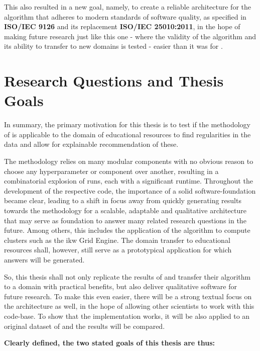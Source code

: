 This also resulted in a new goal, namely, to create a reliable architecture for the algorithm that adheres to modern standards of software quality, as specified in \textbf{ISO/IEC 9126} and its replacement \textbf{ISO/IEC 25010:2011}, in the hope of making future research just like this one - where the validity of the algorithm and its ability to transfer to new domains is tested - easier than it was for \me.



\section{Research Questions and Thesis Goals}
\label{sec:goals_research_questions}

In summary, the primary motivation for this thesis is to test if the methodology of \textcite{Derrac2015} is applicable to the domain of educational resources to find regularities in the data and allow for explainable recommendation of these. 

The methodology relies on many modular components with no obvious reason to choose any hyperparameter or component over another, resulting in a combinatorial explosion of runs, each with a significant runtime. Throughout the development of the respective code, the importance of a solid software-foundation became clear, leading to a shift in focus away from quickly generating results towards the methodology for a scalable, adaptable and qualitative architecture that may serve as foundation to answer many related research questions in the future. Among others, this includes the application of the algorithm to compute clusters such as the \gls{ikw} Grid Engine. The domain transfer to educational resources shall, however, still serve as a prototypical application for which answers will be generated.

So, this thesis shall not only replicate the results of \cite{Derrac2015} and transfer their algorithm to a domain with practical benefits, but also deliver qualitative software for future research. To make this even easier, there will be a strong textual focus on the architecture as well, in the hope of allowing other scientists to work with this code-base. To show that the implementation works, it will be also applied to an original dataset of \cite{Derrac2015} and the results will be compared.

\textbf{Clearly defined, the two stated goals of this thesis are thus:}

